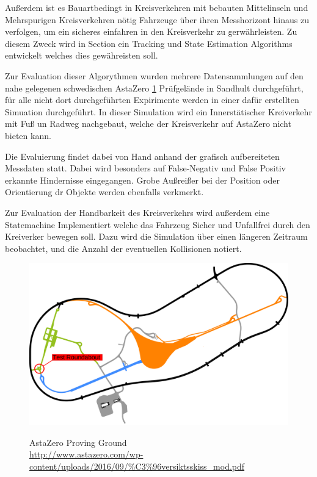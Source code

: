 \documentclass[11pt,oneside,openright]{mpreport}
\begin{document}
Außerdem ist es Bauartbedingt in Kreisverkehren mit bebauten Mittelinseln und Mehrspurigen Kreisverkehren nötig
Fahrzeuge über ihren Messhorizont hinaus zu verfolgen, um ein sicheres einfahren in den Kreisverkehr zu gerwährleisten.
Zu diesem Zweck wird in Section  ein Tracking und State Estimation Algorithms entwickelt welches dies gewähreisten soll.

Zur Evaluation dieser Algorythmen wurden mehrere Datensammlungen auf den nahe gelegenen schwedischen AstaZero \cref{astazero} Prüfgelände in Sandhult
durchgeführt, für alle nicht dort durchgeführten Expirimente werden in einer dafür erstellten Simuation durchgeführt. In dieser Simulation
wird ein Innerstätischer Kreiverkehr mit Fuß un Radweg nachgebaut, welche der Kreisverkehr auf AstaZero nicht bieten kann.

Die Evaluierung findet dabei von Hand anhand der grafisch aufbereiteten Messdaten statt. Dabei wird besonders auf False-Negativ
und False Positiv erkannte Hindernisse eingegangen. Grobe Außreißer bei der Position oder Orientierung dr Objekte werden ebenfalls verkmerkt.

Zur Evaluation der Handbarkeit des Kreisverkehrs wird außerdem eine Statemachine Implementiert welche das Fahrzeug Sicher und Unfallfrei
durch den Kreiverker bewegen soll. Dazu wird die Simulation über einen längeren Zeitraum beobachtet, und die Anzahl der eventuellen
Kollisionen notiert.

\begin{figure}[!ht]
\caption{AstaZero Proving Ground\\ \url{http://www.astazero.com/wp-content/uploads/2016/09/\%C3\%96versiktsskiss_mod.pdf} }
\includegraphics[width=\textwidth]{bilder/AstaZero.pdf}
\label{astazero}
\end{figure}
\end{document}
